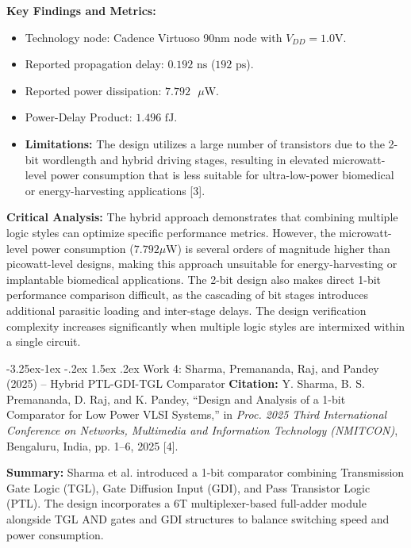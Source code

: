 \documentclass[12pt,a4paper,oneside]{report}
\makeatletter
\renewcommand\subsection{\@startsection{subsection}{2}{\z@}%
                                     {-3.25ex\@plus -1ex \@minus -.2ex}%
                                     {1.5ex \@plus .2ex}%
                                     {\normalfont\normalsize\bfseries\itshape}}
\makeatother
\begin{document}
\noindent\textbf{Key Findings and Metrics:}
\begin{itemize}
\item Technology node: Cadence Virtuoso 90nm node with $V_{DD} = 1.0\text{V}$.
\item Reported propagation delay: $0.192\text{ ns}$ ($192\text{ ps}$).
\item Reported power dissipation: $7.792\text{ }\mu\text{W}$.
\item Power-Delay Product: $1.496\text{ fJ}$.
\item \textbf{Limitations:} The design utilizes a large number of transistors due to the 2-bit wordlength and hybrid driving stages, resulting in elevated microwatt-level power consumption that is less suitable for ultra-low-power biomedical or energy-harvesting applications [3].
\end{itemize}

\noindent\textbf{Critical Analysis:} The hybrid approach demonstrates that combining multiple logic styles can optimize specific performance metrics. However, the microwatt-level power consumption ($7.792 \mu\text{W}$) is several orders of magnitude higher than picowatt-level designs, making this approach unsuitable for energy-harvesting or implantable biomedical applications. The 2-bit design also makes direct 1-bit performance comparison difficult, as the cascading of bit stages introduces additional parasitic loading and inter-stage delays. The design verification complexity increases significantly when multiple logic styles are intermixed within a single circuit.

\subsection{Work 4: Sharma, Premananda, Raj, and Pandey (2025) -- Hybrid PTL-GDI-TGL Comparator}
\textbf{Citation:} Y. Sharma, B. S. Premananda, D. Raj, and K. Pandey, ``Design and Analysis of a 1-bit Comparator for Low Power VLSI Systems,'' in \textit{Proc. 2025 Third International Conference on Networks, Multimedia and Information Technology (NMITCON)}, Bengaluru, India, pp. 1--6, 2025 [4].

\noindent\textbf{Summary:} Sharma et al. introduced a 1-bit comparator combining Transmission Gate Logic (TGL), Gate Diffusion Input (GDI), and Pass Transistor Logic (PTL). The design incorporates a 6T multiplexer-based full-adder module alongside TGL AND gates and GDI structures to balance switching speed and power consumption.
\end{document}
